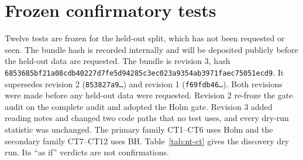 \clearpage
\section{Frozen confirmatory tests}
\label{app:nt-prereg}

Twelve tests are frozen for the held-out split, which has not been requested or seen. The bundle hash is recorded internally and will be deposited publicly before the held-out data are requested. The bundle is revision 3, hash \texttt{6853685bf21a08cdb40227d7fe5d94285c3ec023a9354ab3971faec75051ecd9}. It supersedes revision 2 (\texttt{853827a9\dots}) and revision 1 (\texttt{f69fdb46\dots}). Both revisions were made before any held-out data were requested. Revision 2 re-froze the gate audit on the complete audit and adopted the Holm gate. Revision 3 added reading notes and changed two code paths that no test uses, and every dry-run statistic was unchanged. The primary family CT1--CT6 uses Holm and the secondary family CT7--CT12 uses BH. Table~\ref{tab:nt-ct} gives the discovery dry run. Its ``as if'' verdicts are not confirmations.

